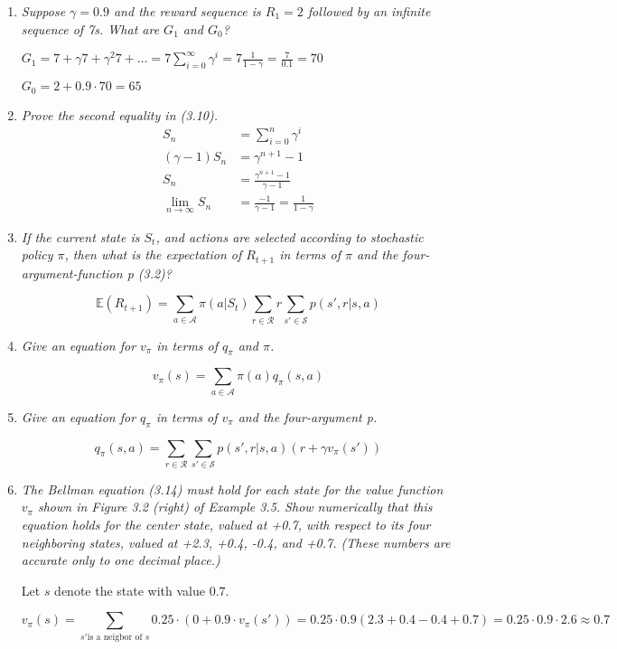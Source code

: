 \documentclass[12pt,a4paper]{article}
\begin{document}
\begin{enumerate}
\item
  \textit{Suppose $\gamma = 0.9$ and the reward sequence is $R_1 = 2$ followed by an infinite
  sequence of 7s. What are $G_1$ and $G_0$?}

  $G_1 = 7 + \gamma 7 + \gamma^2 7 + \dots = 7 \sum\limits_{i = 0}^{\infty} \gamma^i =
  7 \frac{1}{1 - \gamma} = \frac{7}{0.1} = 70$

  $G_0 = 2 + 0.9 \cdot 70 = 65$

\item
  \textit{Prove the second equality in (3.10).}
  \begin{align*}
    S_n &= \sum\limits_{i = 0}^n \gamma^i\\
    (\gamma - 1)S_n &= \gamma^{n + 1} - 1\\
    S_n &= \frac{\gamma^{n + 1} - 1}{\gamma - 1}\\
    \lim_{n \to \infty} S_n &= \frac{ - 1}{\gamma - 1} = \frac{1}{1 - \gamma}
  \end{align*}

\item
  \textit{If the current state is $S_t$, and actions are selected according to stochastic
  policy $\pi$, then what is the expectation of $R_{t+1}$ in terms of $\pi$ and the four-argument-function p (3.2)?}

  \[\mathbb{E}(R_{t + 1}) = \sum\limits_{a \in \mathcal{A}} \pi(a | S_t)
  \sum\limits_{r \in \mathcal{R}} r \sum\limits_{s' \in \mathcal{S}}p(s', r | s, a) \]

\item
  \textit{Give an equation for $v_{\pi}$ in terms of $q_{\pi}$ and $\pi$.}

  \[v_\pi(s) = \sum\limits_{a \in \mathcal{A}} \pi(a) q_\pi(s, a)\]

\item
  \textit{Give an equation for $q_{\pi}$ in terms of $v_{\pi}$ and the four-argument p.}

  \[
  q_\pi(s,a) = \sum\limits_{r \in \mathcal{R}} \sum\limits_{s' \in \mathcal{S}}p(s', r |s, a) (r + \gamma v_\pi(s'))
  \]

\item
  \textit{The Bellman equation (3.14) must hold for each state for the value function
  $v_\pi$ shown in Figure 3.2 (right) of Example 3.5. Show numerically that this equation holds
  for the center state, valued at +0.7, with respect to its four neighboring states, valued at
  +2.3, +0.4, -0.4, and +0.7. (These numbers are accurate only to one decimal place.)}

  Let $s$ denote the state with value $0.7$.

  \[v_\pi(s) = \sum\limits_{s' \text{is a neigbor of } s} 0.25 \cdot  (0 + 0.9 \cdot v_\pi(s')) =
  0.25 \cdot 0.9(2.3 + 0.4 - 0.4 + 0.7) = 0.25 \cdot 0.9 \cdot 2.6 \approx 0.7\]

\end{enumerate}
\end{document}
